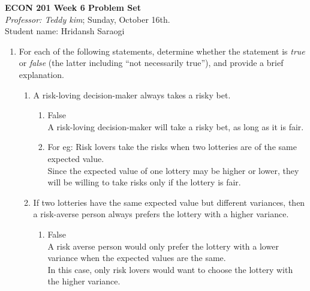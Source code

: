 \documentclass[11pt]{article}
\begin{document}
\begin{center}
\textbf{ECON 201 Week 6 Problem Set}\\
\textit {Professor: Teddy kim};  
Sunday, October 16th.
\\Student name: Hridansh Saraogi
\end{center}

\begin{enumerate}
\item For each of the following statements, determine whether
the statement is \emph{true} or \emph{false} (the latter including ``not necessarily true''), and provide a brief explanation.

    \begin{enumerate}
   	\item A risk-loving decision-maker always takes a risky bet.
        \begin{enumerate}
            \item False\\
            A risk-loving decision-maker will take a risky bet, as long as it is fair.
            \item For eg: Risk lovers take the risks when two lotteries are of the same expected value. \\
            Since the expected value of one lottery may be higher or lower, they will be willing to take risks only if the lottery is fair.
        \end{enumerate}
	
	\item If two lotteries have the same expected value but different variances, then a risk-averse person always prefers the lottery with a higher variance.
	    \begin{enumerate}
	        \item False\\
	        A risk averse person would only prefer the lottery with a lower variance when the expected values are the same. \\In this case, only risk lovers would want to choose the lottery with the higher variance.
	    \end{enumerate}


\end{enumerate}
\end{enumerate}
\end{document}
